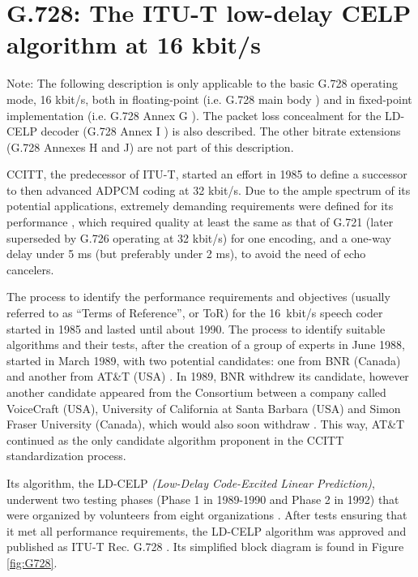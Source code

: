 % 
\chapter{G.728: The ITU-T low-delay CELP algorithm at 16 kbit/s}

Note: The following description is only applicable to the basic G.728
operating mode, 16 kbit/s, both in floating-point (i.e. G.728 main
body \cite{G.728}) and in fixed-point implementation (i.e. G.728 Annex
G \cite{G.728G}). The packet loss concealment for the LD-CELP decoder
(G.728 Annex I \cite{G.728I}) is also described. The other bitrate
extensions (G.728 Annexes H and J) are not part of this description.

CCITT, the predecessor of ITU-T, started an effort in 1985 to define a
successor to then advanced ADPCM coding at 32 kbit/s. Due to the ample
spectrum of its potential applications, extremely demanding
requirements were defined for its performance \cite{Q21-ROs}, which
required quality at least the same as that of G.721 (later superseded
by G.726 operating at 32 kbit/s) for one encoding, and a one-way delay
under 5 ms (but preferably under 2 ms), to avoid the need of echo
cancelers.

The process to identify the performance requirements and objectives
(usually referred to as ``Terms of Reference'', or ToR) for the
16~kbit/s speech coder started in 1985 and lasted until about
1990. The process to identify suitable algorithms and their tests,
after the creation of a group of experts in June 1988, started in
March 1989, with two potential candidates: one from BNR (Canada)
\cite{BNR-coder} and another from AT\&T (USA) \cite{LD-CELP-1}. In
1989, BNR withdrew \cite{BNR-Letter} its candidate, however another
candidate appeared from the Consortium between a company called
VoiceCraft (USA), University of California at Santa Barbara (USA) and
Simon Fraser University (Canada), which would also soon withdraw
\cite{Consort-Letter,LD-VCX-HLD,LD-VCX,LD-VCX2}. This way, AT\&T
continued as the only candidate algorithm proponent in the CCITT
standardization process.

Its algorithm, the LD-CELP {\em (Low-Delay Code-Excited Linear
  Prediction)}, underwent two testing phases (Phase 1 in 1989-1990 and
Phase 2 in 1992) that were organized by volunteers from eight
organizations \cite{Q026}. After tests ensuring that it met all
performance requirements, the LD-CELP algorithm was approved and
published as ITU-T Rec. G.728 \cite{G.728}. Its simplified block
diagram is found in Figure \ref{fig:G728}.

